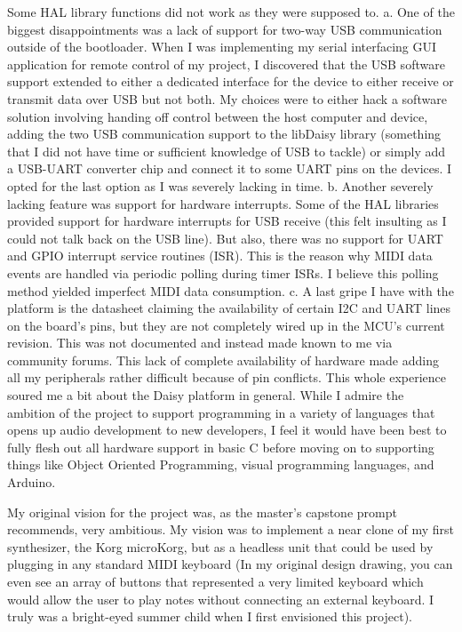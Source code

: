 \documentclass[acmlarge,screen]{acmart}
\begin{document}
Some HAL library functions did not work as they were supposed to. a. One of the biggest disappointments was a lack of support for two-way USB communication outside of the bootloader. When I was implementing my serial interfacing GUI application for remote control of my project, I discovered that the USB software support extended to either a dedicated interface for the device to either receive or transmit data over USB but not both. My choices were to either hack a software solution involving handing off control between the host computer and device, adding the two USB communication support to the libDaisy library (something that I did not have time or sufficient knowledge of USB to tackle) or simply add a USB-UART converter chip and connect it to some UART pins on the devices. I opted for the last option as I was severely lacking in time. b. Another severely lacking feature was support for hardware interrupts. Some of the HAL libraries provided support for hardware interrupts for USB receive (this felt insulting as I could not talk back on the USB line). But also, there was no support for UART and GPIO interrupt service routines (ISR). This is the reason why MIDI data events are handled via periodic polling during timer ISRs. I believe this polling method yielded imperfect MIDI data consumption. c. A last gripe I have with the platform is the datasheet claiming the availability of certain I2C and UART lines on the board's pins, but they are not completely wired up in the MCU's current revision. This was not documented and instead made known to me via community forums. This lack of complete availability of hardware made adding all my peripherals rather difficult because of pin conflicts. This whole experience soured me a bit about the Daisy platform in general. While I admire the ambition of the project to support programming in a variety of languages that opens up audio development to new developers, I feel it would have been best to fully flesh out all hardware support in basic C before moving on to supporting things like Object Oriented Programming, visual programming languages, and Arduino.

My original vision for the project was, as the master's capstone prompt recommends, very ambitious. My vision was to implement a near clone of my first synthesizer, the Korg microKorg, but as a headless unit that could be used by plugging in any standard MIDI keyboard (In my original design drawing, you can even see an array of buttons that represented a very limited keyboard which would allow the user to play notes without connecting an external keyboard. I truly was a bright-eyed summer child when I first envisioned this project).
\end{document}
